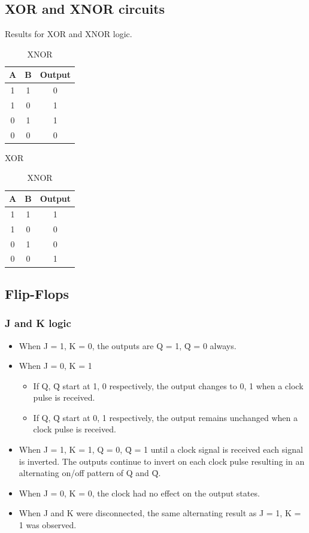 \documentclass{article}
\begin{document}
\vspace{3cm}
\subsection*{XOR and XNOR circuits}
Results for XOR and XNOR logic.
\begin{table}[h]
\centering
\parbox{.45\linewidth}{
    \centering
    \begin{tabular}{c c | c}
    A & B & Output\\
    \hline
    1&1&0\\
    1&0&1\\
    0&1&1\\
    0&0&0\\
    \end{tabular}
    \caption{XOR}
    \label{tab:8}
}
\parbox{.45\linewidth}{
    \centering
    \begin{tabular}{c c | c}
    A & B & Output\\
    \hline
    1&1&1\\
    1&0&0\\
    0&1&0\\
    0&0&1\\
    \end{tabular}
    \caption{XNOR}
    \label{tab:5}
}
\end{table}

\subsection*{Flip-Flops}
\subsubsection*{J and K logic}
\begin{itemize}
    \item When J = 1, K = 0, the outputs are Q = 1, \=Q = 0 always.
    \item When J = 0, K = 1
        \begin{itemize}
            \item If Q, \=Q start at 1, 0 respectively, the output changes to 0, 1 when a clock pulse is received. 
            \item If Q, \=Q start at 0, 1 respectively, the output remains unchanged when a clock pulse is received.
        \end{itemize}
    \item When J = 1, K = 1, Q = 0, \=Q = 1 until a clock signal is received each signal is inverted. The outputs continue to invert on each clock pulse resulting in an alternating on/off pattern of Q and \=Q.
    \item When J = 0, K = 0, the clock had no effect on the output states.
    \item When J and K were disconnected, the same alternating result as J = 1, K = 1 was observed.
\end{itemize}
\end{document}
